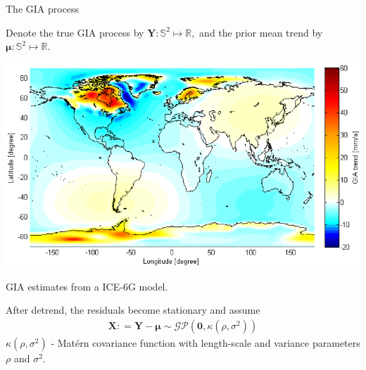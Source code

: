 \documentclass{beamer}
\begin{document}
\begin{frame}{The GIA process}

\vspace{0.3cm}
\begin{minipage}[c]{0.45\textwidth}
Denote the true GIA process by 
$\bm{Y}: \mathbb{S}^2 \mapsto \mathbb{R},$
and the prior mean trend by
$\bm{\mu}: \mathbb{S}^2 \mapsto \mathbb{R}$.
\end{minipage}%
\hfill
\begin{minipage}[c]{0.5\textwidth}
\centering
\includegraphics[width = \textwidth, clip]{images/ice6g}

\tiny{GIA estimates from a ICE-6G model.}
\end{minipage}

\vspace{0.3cm}
After detrend, the residuals become stationary and assume
\begin{align}\label{eq:GIAresid}
 \bm{X}: = \bm{Y} - \bm{\mu} \sim \mathcal{GP}(\bm{0}, \kappa(\rho, \sigma^2))
\end{align}
$\kappa(\rho, \sigma^2)$ - Mat{\'e}rn covariance function with length-scale and variance parameters $\rho$ and $\sigma^2$.

\end{frame}
\end{document}
